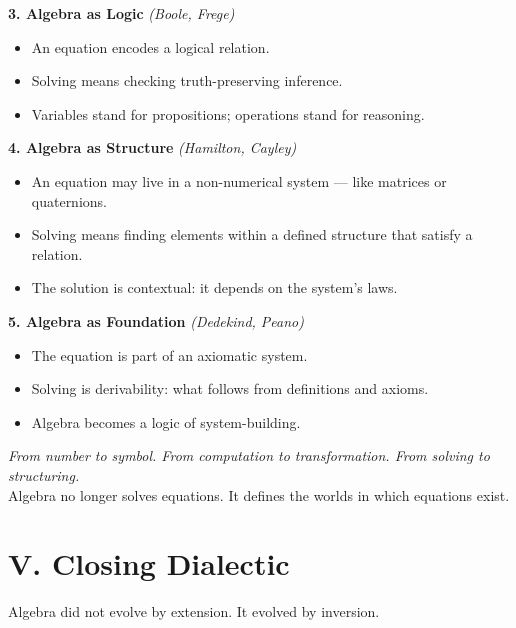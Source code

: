 \documentclass[9pt]{article}
\begin{document}
\textbf{3. Algebra as Logic} \hfill \textit{(Boole, Frege)}

\begin{itemize}
  \item An equation encodes a logical relation.
  \item Solving means checking truth-preserving inference.
  \item Variables stand for propositions; operations stand for reasoning.
\end{itemize}

\bigskip

\textbf{4. Algebra as Structure} \hfill \textit{(Hamilton, Cayley)}

\begin{itemize}
  \item An equation may live in a non-numerical system — like matrices or quaternions.
  \item Solving means finding elements within a defined structure that satisfy a relation.
  \item The solution is contextual: it depends on the system’s laws.
\end{itemize}

\bigskip

\textbf{5. Algebra as Foundation} \hfill \textit{(Dedekind, Peano)}

\begin{itemize}
  \item The equation is part of an axiomatic system.
  \item Solving is derivability: what follows from definitions and axioms.
  \item Algebra becomes a logic of system-building.
\end{itemize}

\bigskip

\textit{From number to symbol.  
From computation to transformation.  
From solving to structuring.}\\

\noindent
Algebra no longer solves equations.  
It defines the worlds in which equations exist.

\newpage

\section*{V. Closing Dialectic}

Algebra did not evolve by extension.  
It evolved by inversion.\\
\end{document}
